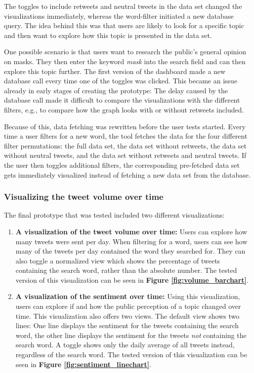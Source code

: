 The toggles to include retweets and neutral tweets in the data set changed the visualizations immediately, whereas the word-filter initiated a new database query. The idea behind this was that users are likely to look for a specific topic and then want to explore how this topic is presented in the data set.

One possible scenario is that users want to research the public's general opinion on masks. They then enter the keyword \emph{mask} into the search field and can then explore this topic further. The first version of the dashboard made a new database call every time one of the toggles was clicked. This became an issue already in early stages of creating the prototype: The delay caused by the database call made it difficult to compare the visualizations with the different filters, e.g., to compare how the graph looks with or without retweets included.

Because of this, data fetching was rewritten before the user tests started. Every time a user filters for a new word, the tool fetches the data for the four different filter permutations: the full data set, the data set without retweets, the data set without neutral tweets, and the data set without retweets and neutral tweets. If the user then toggles additional filters, the corresponding pre-fetched data set gets immediately visualized instead of fetching a new data set from the database.

\subsubsection{Visualizing the tweet volume over time}
The final prototype that was tested included two different visualizations:

\begin{enumerate}
    \item \textbf{A visualization of the tweet volume over time:} Users can explore how many tweets were sent per day. When filtering for a word, users can see how many of the tweets per day contained the word they searched for. They can also toggle a normalized view which shows the percentage of tweets containing the search word, rather than the absolute number. The tested version of this visualization can be seen in \textbf{Figure \ref{fig:volume_barchart}}.
    \item \textbf{A visualization of the sentiment over time:} Using this visualization, users can explore if and how the public perception of a topic changed over time. This visualization also offers two views. The default view shows two lines: One line displays the sentiment for the tweets containing the search word, the other line displays the sentiment for the tweets \emph{not} containing the search word. A toggle shows only the daily average of all tweets instead, regardless of the search word. The tested version of this visualization can be seen in \textbf{Figure \ref{fig:sentiment_linechart}}.
\end{enumerate}

